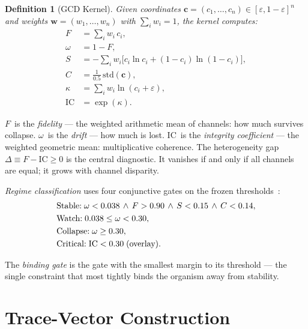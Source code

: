 \documentclass[
  aps,
  prd,
  twocolumn,
  superscriptaddress,
  nofootinbib,
  floatfix
]{revtex4-2}
\newtheorem{definition}[theorem]{Definition}
\newcommand{\eps}{\varepsilon}
\newcommand{\tvec}{\mathbf{c}}
\newcommand{\wvec}{\mathbf{w}}
\newcommand{\IC}{\mathrm{IC}}
\begin{document}
\begin{definition}[GCD Kernel]\label{def:kernel}
Given coordinates $\tvec = (c_1, \ldots, c_n) \in
[\eps, 1{-}\eps]^n$ and weights $\wvec = (w_1, \ldots, w_n)$
with $\sum_i w_i = 1$, the kernel computes:
\begin{align}
  F &= \sum_i w_i \, c_i, \label{eq:F} \\
  \omega &= 1 - F, \label{eq:omega} \\
  S &= -\sum_i w_i \bigl[c_i \ln c_i
       + (1{-}c_i)\ln(1{-}c_i)\bigr], \label{eq:S} \\
  C &= \frac{1}{0.5}\,\mathrm{std}(\tvec), \label{eq:C} \\
  \kappa &= \sum_i w_i \ln(c_i + \eps), \label{eq:kappa} \\
  \IC &= \exp(\kappa). \label{eq:IC}
\end{align}
\end{definition}

$F$~is the \emph{fidelity} --- the weighted arithmetic mean
of channels: how much survives collapse.
$\omega$~is the \emph{drift} --- how much is lost.
$\IC$~is the \emph{integrity coefficient} --- the weighted
geometric mean: multiplicative coherence.
The heterogeneity gap $\Delta \equiv F - \IC \geq 0$ is the
central diagnostic.  It vanishes if and only if all channels
are equal; it grows with channel disparity.

\emph{Regime classification} uses four conjunctive gates
on the frozen thresholds~\cite{paulus2025umcp}:
\begin{align}
  &\text{Stable:}\;
    \omega < 0.038 \,\wedge\, F > 0.90
    \,\wedge\, S < 0.15 \,\wedge\, C < 0.14, \notag\\
  &\text{Watch:}\;
    0.038 \le \omega < 0.30, \notag\\
  &\text{Collapse:}\;
    \omega \ge 0.30, \notag\\
  &\text{Critical:}\;
    \IC < 0.30 \;\text{(overlay)}. \label{eq:regimes}
\end{align}

The \emph{binding gate} is the gate with the smallest margin
to its threshold --- the single constraint that most tightly
binds the organism away from stability.

\section{Trace-Vector Construction}\label{sec:trace}
\end{document}
